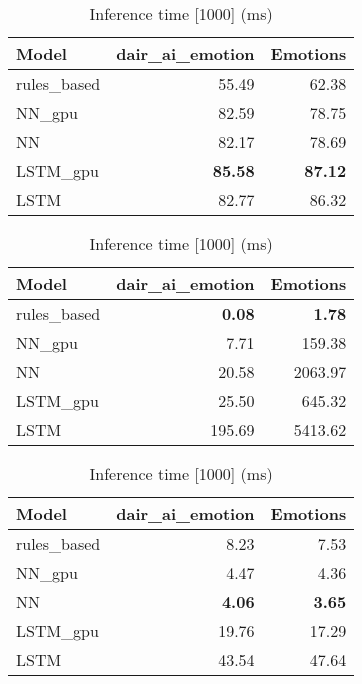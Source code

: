 \begin{table}[!ht]
\begin{minipage}{0.45\textwidth}
    \end{minipage}
    \hfill
    \begin{minipage}{0.45\textwidth}
        \centering
        \small
        \caption{F1 \(\%\)}
        \begin{tabular}{lrr}
            \toprule
            Model        & dair\_ai\_emotion & Emotions       \\
            \midrule
            rules\_based & 55.49             & 62.38          \\
            NN\_gpu      & 82.59             & 78.75          \\
            NN           & 82.17             & 78.69          \\
            LSTM\_gpu    & \textbf{85.58}    & \textbf{87.12} \\
            LSTM         & 82.77             & 86.32          \\
            \bottomrule
        \end{tabular}
    \end{minipage}
    \vspace{0.1em}
    \begin{minipage}{0.45\textwidth}
        \centering
        \small
        \caption{Training time (s)}
        \begin{tabular}{lrr}
            \toprule
            Model        & dair\_ai\_emotion & Emotions      \\
            \midrule
            rules\_based & \textbf{0.08}     & \textbf{1.78} \\
            NN\_gpu      & 7.71              & 159.38        \\
            NN           & 20.58             & 2063.97       \\
            LSTM\_gpu    & 25.50             & 645.32        \\
            LSTM         & 195.69            & 5413.62       \\
            \bottomrule
        \end{tabular}
    \end{minipage}
    \hfill
    \begin{minipage}{0.45\textwidth}
        \centering
        \small
        \caption{Inference time [1000] (ms)}
        \begin{tabular}{lrr}
            \toprule
            Model        & dair\_ai\_emotion & Emotions      \\
            \midrule
            rules\_based & 8.23              & 7.53          \\
            NN\_gpu      & 4.47              & 4.36          \\
            NN           & \textbf{4.06}     & \textbf{3.65} \\
            LSTM\_gpu    & 19.76             & 17.29         \\
            LSTM         & 43.54             & 47.64         \\
            \bottomrule
        \end{tabular}
    \end{minipage}
\end{table}

